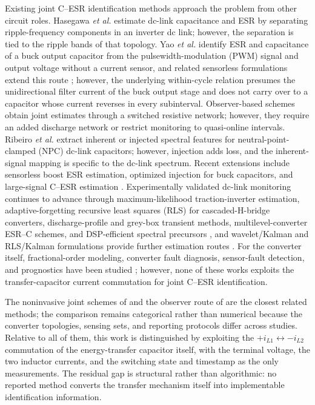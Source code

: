 Existing joint C--ESR identification methods approach the problem from other circuit roles. Hasegawa \emph{et al.} \cite{hasegawa2018dclink} estimate dc-link capacitance and ESR by separating ripple-frequency components in an inverter dc link; however, the separation is tied to the ripple bands of that topology. Yao \emph{et al.} \cite{yao2015buck} identify ESR and capacitance of a buck output capacitor from the pulsewidth-modulation (PWM) signal and output voltage without a current sensor, and related sensorless formulations extend this route \cite{tang2019sensorless}; however, the underlying within-cycle relation presumes the unidirectional filter current of the buck output stage and does not carry over to a capacitor whose current reverses in every subinterval. Observer-based schemes \cite{barbulescu2022observer,barbulescu2023implementation,caiman2024quasionline} obtain joint estimates through a switched resistive network; however, they require an added discharge network or restrict monitoring to quasi-online intervals. Ribeiro \emph{et al.} \cite{ribeiro2025inherent,ribeiro2024injection,ribeiro2023wavelet} extract inherent or injected spectral features for neutral-point-clamped (NPC) dc-link capacitors; however, injection adds loss, and the inherent-signal mapping is specific to the dc-link spectrum. Recent extensions include sensorless boost ESR estimation, optimized injection for buck capacitors, and large-signal C--ESR estimation \cite{leong2025boostesr,zhang2025injection,zhang2025largesignal}. Experimentally validated dc-link monitoring continues to advance through maximum-likelihood traction-inverter estimation, adaptive-forgetting recursive least squares (RLS) for cascaded-H-bridge converters, discharge-profile and grey-box transient methods, multilevel-converter ESR--C schemes, and DSP-efficient spectral precursors \cite{wu2025mlrail,wang2024chb,wei2024discharge,zhao2023greybox,deng2020mmc,asoodar2024mmc,sundararajan2020goertzel}, and wavelet/Kalman and RLS/Kalman formulations provide further estimation routes \cite{amaral2024waveletkf,zhang2025haar,reichbach2016rls,chen2018vffrls}. For the \Cuk{} converter itself, fractional-order modeling, converter fault diagnosis, sensor-fault detection, and prognostics have been studied \cite{wang2021fractionalcuk,prathiba2023cuk,ajra2024sensorfault,samie2015prognostic}; however, none of these works exploits the transfer-capacitor current commutation for joint C--ESR identification.

The noninvasive joint schemes of \cite{hasegawa2018dclink,yao2015buck,ribeiro2025inherent,amaral2024waveletkf} and the observer route of \cite{barbulescu2022observer} are the closest related methods; the comparison remains categorical rather than numerical because the converter topologies, sensing sets, and reporting protocols differ across studies. Relative to all of them, this work is distinguished by exploiting the $+i_{L1}\leftrightarrow-i_{L2}$ commutation of the energy-transfer capacitor itself, with the terminal voltage, the two inductor currents, and the switching state and timestamp as the only measurements. The residual gap is structural rather than algorithmic: no reported method converts the \Cuk{} transfer mechanism itself into implementable identification information.

